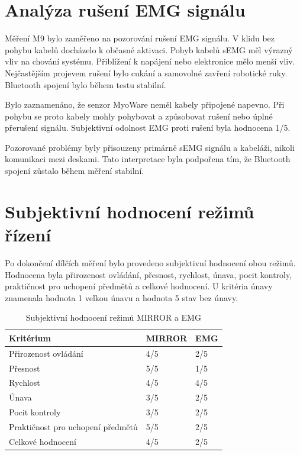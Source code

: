 \documentclass[FZS,DP]{tulthesis}
\begin{document}
\section{Analýza rušení EMG signálu}
\label{sec:ruseni-emg}

Měření M9 bylo zaměřeno na pozorování rušení EMG signálu. V klidu bez pohybu kabelů docházelo k občasné aktivaci. Pohyb kabelů sEMG měl výrazný vliv na chování systému. Přiblížení k napájení nebo elektronice mělo menší vliv. Nejčastějším projevem rušení bylo cukání a samovolné zavření robotické ruky. Bluetooth spojení bylo během testu stabilní.

Bylo zaznamenáno, že senzor MyoWare neměl kabely připojené napevno. Při pohybu se proto kabely mohly pohybovat a způsobovat rušení nebo úplné přerušení signálu. Subjektivní odolnost EMG proti rušení byla hodnocena 1/5.

Pozorované problémy byly přisouzeny primárně sEMG signálu a kabeláži, nikoli komunikaci mezi deskami. Tato interpretace byla podpořena tím, že Bluetooth spojení zůstalo během měření stabilní.

\section{Subjektivní hodnocení režimů řízení}
\label{sec:subjektivni-hodnoceni}

Po dokončení dílčích měření bylo provedeno subjektivní hodnocení obou režimů. Hodnocena byla přirozenost ovládání, přesnost, rychlost, únava, pocit kontroly, praktičnost pro uchopení předmětů a celkové hodnocení. U kritéria únavy znamenala hodnota 1 velkou únavu a hodnota 5 stav bez únavy.

\begin{table}[H]
\centering
\caption{Subjektivní hodnocení režimů MIRROR a EMG}
\label{tab:subjektivni-hodnoceni}
\begin{tabular}{|p{}|p{}|p{}|}
\hline
\textbf{Kritérium} & \textbf{MIRROR} & \textbf{EMG} \\
\hline
Přirozenost ovládání & 4/5 & 2/5 \\
\hline
Přesnost & 5/5 & 1/5 \\
\hline
Rychlost & 4/5 & 4/5 \\
\hline
Únava & 3/5 & 2/5 \\
\hline
Pocit kontroly & 3/5 & 2/5 \\
\hline
Praktičnost pro uchopení předmětů & 5/5 & 2/5 \\
\hline
Celkové hodnocení & 4/5 & 2/5 \\
\hline
\end{tabular}
\end{table}
\end{document}
